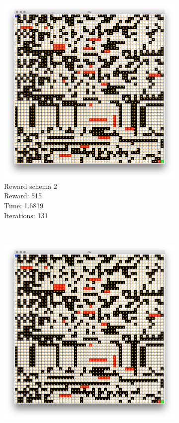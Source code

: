 \documentclass[a4paper,10pt]{article}
\begin{document}
\begin{figure}[H]
\begin{subfigure}[b]{0.3\textwidth}
                \includegraphics[width=\textwidth]{figures/50x50_v_r2.png}
                \caption{Reward schema 2\\
                Reward: 515 \\
                Time:  1.6819\\
                Iterations: 131}
                \label{fig:tiger}
        \end{subfigure}
        ~ %
        \begin{subfigure}[b]{0.3\textwidth}
                \includegraphics[width=\textwidth]{figures/50x50_v_r3.png}

\end{subfigure}
\end{figure}
\end{document}
